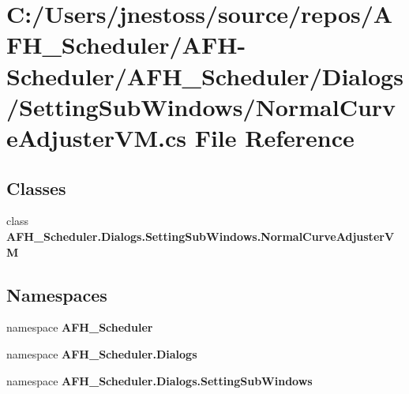 \section{C\+:/\+Users/jnestoss/source/repos/\+A\+F\+H\+\_\+\+Scheduler/\+A\+F\+H-\/\+Scheduler/\+A\+F\+H\+\_\+\+Scheduler/\+Dialogs/\+Setting\+Sub\+Windows/\+Normal\+Curve\+Adjuster\+VM.cs File Reference}
\label{_normal_curve_adjuster_v_m_8cs}
\subsection*{Classes}
\begin{DoxyCompactItemize}
\item 
class \textbf{ A\+F\+H\+\_\+\+Scheduler.\+Dialogs.\+Setting\+Sub\+Windows.\+Normal\+Curve\+Adjuster\+VM}
\end{DoxyCompactItemize}
\subsection*{Namespaces}
\begin{DoxyCompactItemize}
\item 
namespace \textbf{ A\+F\+H\+\_\+\+Scheduler}
\item 
namespace \textbf{ A\+F\+H\+\_\+\+Scheduler.\+Dialogs}
\item 
namespace \textbf{ A\+F\+H\+\_\+\+Scheduler.\+Dialogs.\+Setting\+Sub\+Windows}
\end{DoxyCompactItemize}
